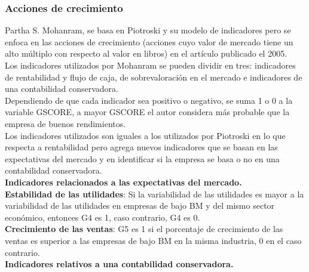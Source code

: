 \subsubsection{Acciones de crecimiento}


Partha S. Mohanram, se basa en Piotroski y su modelo de indicadores pero se enfoca en las acciones de crecimiento (acciones cuyo valor de mercado tiene un alto múltiplo con respecto al valor en libros) en el artículo \cite{Mohanram2005} publicado el 2005. \\

Los indicadores utilizados por Mohanram se pueden dividir en tres: indicadores de rentabilidad y flujo de caja, de sobrevaloración en el mercado e indicadores de una contabilidad conservadora.\\

Dependiendo de que cada indicador sea positivo o negativo, se suma 1 o 0 a la variable GSCORE, a mayor GSCORE el autor considera más probable que la empresa de buenos rendimientos.\\

Los indicadores utilizados son iguales a los utilizados por Piotroski en lo que respecta a rentabilidad pero agrega nuevos indicadores que se basan en las expectativas del mercado y en identificar si la empresa se basa o no en una contabilidad conservadora.\\

\textbf{Indicadores relacionados a las expectativas del mercado.}\\

\textbf{Estabilidad de las utilidades}: Si la variabilidad de las utilidades es mayor a la variabilidad de las utilidades en empresas de bajo BM y del mismo sector económico, entonces G4 es 1, caso contrario, G4 es 0.\\

\textbf{Crecimiento de las ventas}: G5 es 1 si el porcentaje de crecimiento de las ventas es superior a las empresas de bajo BM en la misma industria, 0 en el caso contrario.\\

\textbf{Indicadores relativos a una contabilidad conservadora.}\\

